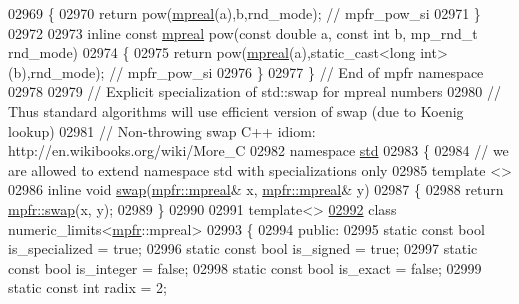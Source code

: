 \begin{DoxyCode}
{{02969 \{
02970     \textcolor{keywordflow}{return} pow(\hyperlink{classmpfr_1_1mpreal}{mpreal}(a),b,rnd\_mode); \textcolor{comment}{// mpfr\_pow\_si}
02971 \}
02972 
02973 \textcolor{keyword}{inline} \textcolor{keyword}{const} \hyperlink{classmpfr_1_1mpreal}{mpreal} pow(\textcolor{keyword}{const} \textcolor{keywordtype}{double} a, \textcolor{keyword}{const} \textcolor{keywordtype}{int} b, mp\_rnd\_t rnd\_mode)
02974 \{
02975     \textcolor{keywordflow}{return} pow(\hyperlink{classmpfr_1_1mpreal}{mpreal}(a),static\_cast<long int>(b),rnd\_mode); \textcolor{comment}{// mpfr\_pow\_si}
02976 \}
02977 \} \textcolor{comment}{// End of mpfr namespace}
02978 
02979 \textcolor{comment}{// Explicit specialization of std::swap for mpreal numbers}
02980 \textcolor{comment}{// Thus standard algorithms will use efficient version of swap (due to Koenig lookup)}
02981 \textcolor{comment}{// Non-throwing swap C++ idiom: http://en.wikibooks.org/wiki/More\_C%
02982 \textcolor{keyword}{namespace }\hyperlink{namespacestd}{std}
02983 \{
02984   \textcolor{comment}{// we are allowed to extend namespace std with specializations only}
02985     \textcolor{keyword}{template} <>
02986     \textcolor{keyword}{inline} \textcolor{keywordtype}{void} \hyperlink{endian_8c_a3ca5ecd34b04d6a243c054ac3a57f68d}{swap}(\hyperlink{classmpfr_1_1mpreal}{mpfr::mpreal}& x, \hyperlink{classmpfr_1_1mpreal}{mpfr::mpreal}& y)
02987     \{
02988         \textcolor{keywordflow}{return} \hyperlink{endian_8c_a3ca5ecd34b04d6a243c054ac3a57f68d}{mpfr::swap}(x, y);
02989     \}
02990 
02991     \textcolor{keyword}{template}<>
\hyperlink{classstd_1_1numeric__limits_3_01mpfr_1_1mpreal_01_4}{02992}     \textcolor{keyword}{class }numeric\_limits<\hyperlink{namespacempfr}{mpfr}::mpreal>
02993     \{
02994     \textcolor{keyword}{public}:
02995         \textcolor{keyword}{static} \textcolor{keyword}{const} \textcolor{keywordtype}{bool} is\_specialized    = \textcolor{keyword}{true};
02996         \textcolor{keyword}{static} \textcolor{keyword}{const} \textcolor{keywordtype}{bool} is\_signed         = \textcolor{keyword}{true};
02997         \textcolor{keyword}{static} \textcolor{keyword}{const} \textcolor{keywordtype}{bool} is\_integer        = \textcolor{keyword}{false};
02998         \textcolor{keyword}{static} \textcolor{keyword}{const} \textcolor{keywordtype}{bool} is\_exact          = \textcolor{keyword}{false};
02999         \textcolor{keyword}{static} \textcolor{keyword}{const} \textcolor{keywordtype}{int}  radix             = 2;
}}}
\end{DoxyCode}
